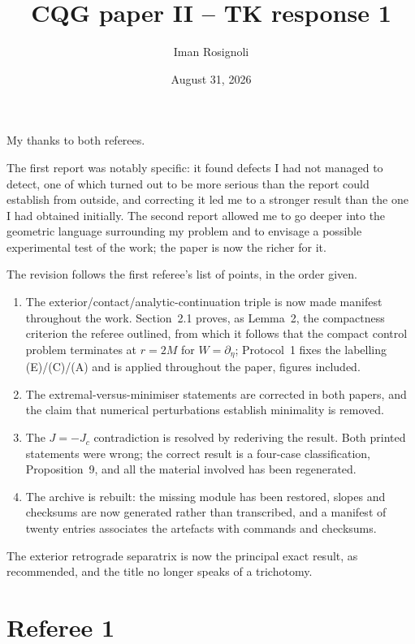 \documentclass{article}
\title{CQG paper II -- TK response 1}
\author{Iman Rosignoli}
\date{August 31, 2026}
\begin{document}
\maketitle

My thanks to both referees.

The first report was notably specific: it found defects I had not managed to
detect, one of which turned out to be more serious than the report could establish
from outside, and correcting it led me to a stronger result than the one I had
obtained initially. The second report allowed me to go deeper into the geometric
language surrounding my problem and to envisage a possible experimental test of the
work; the paper is now the richer for it.

The revision follows the first referee's list of points, in the order given.

\begin{enumerate}
    \item The exterior/contact/analytic-continuation triple is now made manifest
    throughout the work. Section~2.1 proves, as Lemma~2, the compactness criterion
    the referee outlined, from which it follows that the compact control problem
    terminates at \(r=2M\) for \(W=\partial_\eta\); Protocol~1 fixes the
    labelling (E)/(C)/(A) and is applied throughout the paper, figures included.

    \item The extremal-versus-minimiser statements are corrected in both papers,
    and the claim that numerical perturbations establish minimality is removed.

    \item The \(J=-J_c\) contradiction is resolved by rederiving the result. Both
    printed statements were wrong; the correct result is a four-case
    classification, Proposition~9, and all the material involved has been
    regenerated.

    \item The archive is rebuilt: the missing module has been restored, slopes and
    checksums are now generated rather than transcribed, and a manifest of twenty
    entries associates the artefacts with commands and checksums.
\end{enumerate}

The exterior retrograde separatrix is now the principal exact result, as
recommended, and the title no longer speaks of a trichotomy.

\section{Referee 1}
\end{document}
